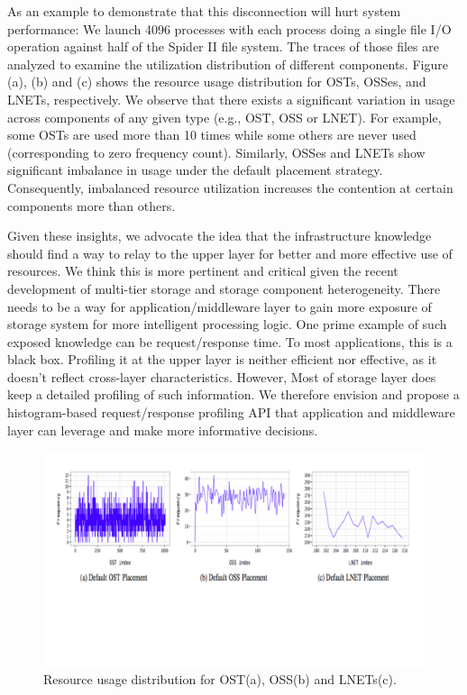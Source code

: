 As an example to demonstrate that this disconnection will hurt
system performance: We launch 4096 processes with each process doing
a single file I/O operation against half of the Spider II file
system. The traces of those files are analyzed to examine the
utilization distribution of different components. Figure (a), (b)
and (c) shows the resource usage distribution for OSTs, OSSes, and
LNETs, respectively. We observe that there exists a significant
variation in usage across components of any given type (e.g., OST,
OSS or LNET). For example, some OSTs are used more than 10 times
while some others are never used (corresponding to zero frequency
count). Similarly, OSSes and LNETs show significant imbalance in
usage under the default placement strategy. Consequently, imbalanced
resource utilization increases the contention at certain components
more than others.

Given these insights, we advocate the idea that the infrastructure
knowledge should find a way to relay to the upper layer for better
and more effective use of resources.   We think this is more pertinent
and critical given the recent development of multi-tier storage and
storage component heterogeneity.  There needs to be a way for
application/middleware layer to gain more exposure of storage system
for more intelligent processing logic.  One prime example of such
exposed knowledge can be request/response time. To most applications,
this is a black box. Profiling it at the upper layer is neither
efficient nor effective, as it doesn't reflect cross-layer
characteristics. However, Most of storage layer does keep a detailed
profiling of such information. We therefore envision and propose a
histogram-based request/response profiling API that application and
middleware layer can leverage and make more informative decisions.


\begin{figure}[tbh]
  \centering
  \includegraphics[width=\columnwidth]{graphics/infrastructure.pdf}\vspace{-1.2in}
  \caption{Resource usage distribution for OST(a), OSS(b) and LNETs(c). }
\end{figure}



